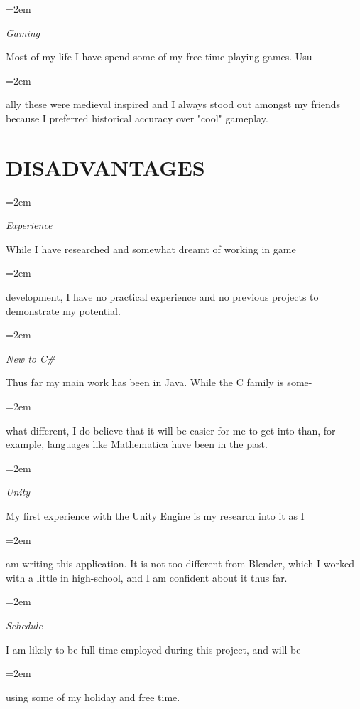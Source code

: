 \documentclass[paper=a4,fontsize=11pt]{scrartcl} %
\newlength{\spacebox}
\newcommand{\sepspace}{\vspace*{1em}}		%
\newcommand{\NewPart}[1]{\section*{\uppercase{#1}}}
\newcommand{\PersonalEntry}[2]{
		\noindent\hangindent=2em\hangafter=0 %
		\parbox{\spacebox}{        %
		\textit{#1}}		       %
		\hspace{1.5em} #2 \par}    %
\newcommand{\SkillsEntry}[2]{      %
		\noindent\hangindent=2em\hangafter=0 %
		\parbox{\spacebox}{        %
		\textit{#1}}			   %
		\hspace{1.5em} \parbox{6\spacebox}{#2} \par}    %
\begin{document}
\SkillsEntry{Gaming}{Most of my life I have spend some of my free time playing games. Usu-}
\vspace{3pt}
\SkillsEntry{}{ally these were medieval inspired and I always stood out amongst my friends because I preferred historical accuracy over "cool" gameplay.}

\NewPart{Disadvantages}

\SkillsEntry{Experience}{While I have researched and somewhat dreamt of working in game}
\vspace{3pt}
\SkillsEntry{}{development, I have no practical experience and no previous projects to demonstrate my potential.}
\sepspace

\SkillsEntry{New to C\#}{Thus far my main work has been in Java. While the C family is some-}
\vspace{3pt}
\SkillsEntry{}{what different, I do believe that it will be easier for me to get into than, for example, languages like Mathematica have been in the past.}
\sepspace

\SkillsEntry{Unity}{My first experience with the Unity Engine is my research into it as I }
\vspace{3pt}
\SkillsEntry{}{am writing this application. It is not too different from Blender, which I worked with a little in high-school, and I am confident about it thus far.}
\sepspace

\SkillsEntry{Schedule}{I am likely to be full time employed during this project, and will be }
\vspace{1pt}
\SkillsEntry{}{using some of my holiday and free time.}


\end{document}
